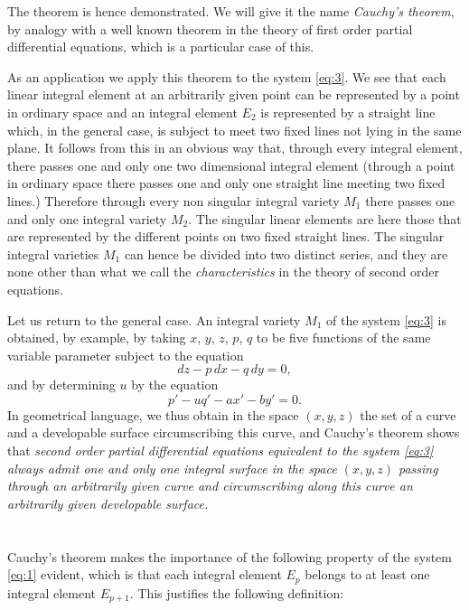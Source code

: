 \documentclass[leqno,11pt]{book}
\theoremstyle{shape1}
\theoremstyle{shapesmall}
\begin{document}
The theorem is hence demonstrated. We will give it the name \emph{Cauchy's theorem}, by analogy with a well known theorem in the theory of first order partial differential equations, which is a particular case of this.

As an application we apply this theorem to the system \eqref{eq:3}. We see that each linear integral element at an arbitrarily given point can be represented by a point in ordinary space and an integral element $E_{2}$ is represented by a straight line which, in the general case, is subject to meet two fixed lines not lying in the same plane. It follows from this in an obvious way that, through every integral element, there passes one and only one two dimensional integral element (through a point in ordinary space there passes one and only one straight line meeting two fixed lines.) Therefore through every non singular integral variety $M_{1}$ there passes one and only one integral variety $M_{2}$. The singular linear elements are here those that are represented by the different points on two fixed straight lines. The singular integral varieties $M_{1}$ can hence be divided into two distinct series, and they are none other than what we call the \emph{characteristics} in the theory of second order equations.

Let us return to the general case. An integral variety $M_{1}$ of the system \eqref{eq:3} is obtained, by example, by taking $x$, $y$, $z$, $p$, $q$ to be five functions of the same variable parameter subject to the equation
\[
dz-p\,dx-q\,dy=0,
\]
and by determining $u$ by the equation
\[
p'-uq'-ax'-by'=0.
\]
In geometrical language, we thus obtain in the space $(x,y,z)$ the set of a curve and a developable surface circumscribing this curve, and Cauchy's theorem shows that \emph{second order partial differential equations equivalent to the system \eqref{eq:3} always admit one and only one integral surface in the space $(x,y,z)$ passing through an arbitrarily given curve and circumscribing along this curve an arbitrarily given developable surface.}

\section{}
\label{sec:4}

Cauchy's theorem makes the importance of the following property of the system \eqref{eq:1} evident, which is that each integral element $E_{p}$ belongs to at least one integral element $E_{p+1}$. This justifies the following definition:
\end{document}
